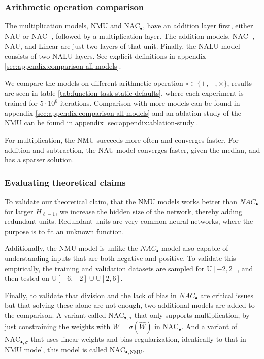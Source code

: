\subsubsection{Arithmetic operation comparison}
The multiplication models, NMU and $\mathrm{NAC}_{\bullet}$, have an addition layer first, either NAU or $\mathrm{NAC}_{+}$, followed by a multiplication layer. The addition models, $\mathrm{NAC}_{+}$, NAU, and Linear are just two layers of that unit. Finally, the NALU model consists of two NALU layers. See explicit definitions in appendix \ref{sec:appendix:comparison-all-models}.

We compare the models on different arithmetic operation $\circ \in \{+, -, \times\}$, results are seen in table \ref{tab:function-task-static-defaults}, where each experiment is trained for $5 \cdot 10^6$ iterations. Comparison with more models can be found in appendix \ref{sec:appendix:comparison-all-models} and an ablation study of the NMU can be found in appendix \ref{sec:appendix:ablation-study}.

For multiplication, the NMU succeeds more often and converges faster. For addition and subtraction, the NAU model converges faster, given the median, and has a sparser solution.



\subsubsection{Evaluating theoretical claims}

To validate our theoretical claim, that the NMU models works better than $NAC_{\bullet}$ for larger $H_{\ell-1}$, we increase the hidden size of the network, thereby adding redundant units. Redundant units are very common neural networks, where the purpose is to fit an unknown function.%

Additionally, the NMU model is unlike the $NAC_{\bullet}$ model also capable of understanding inputs that are both negative and positive. To validate this empirically, the training and validation datasets are sampled for $\mathrm{U}[-2,2]$, and then tested on $\mathrm{U}[-6,-2] \cup \mathrm{U}[2,6]$.

Finally, to validate that division and the lack of bias in $NAC_{\bullet}$ are critical issues but that solving these alone are not enough, two additional models are added to the comparison. A variant called $\mathrm{NAC}_{\bullet, \sigma}$ that only supports multiplication, by just constraining the weights with $W = \sigma(\hat{W})$ in $\mathrm{NAC}_{\bullet}$. And a variant of $\mathrm{NAC}_{\bullet, \sigma}$ that uses linear weights and bias regularization, identically to that in NMU model, this model is called $\mathrm{NAC}_{\bullet, \mathrm{NMU}}$.

